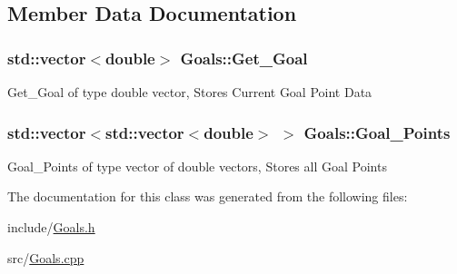 \subsection{Member Data Documentation}
\subsubsection[{\texorpdfstring{Get\+\_\+\+Goal}{Get_Goal}}]{\setlength{\rightskip}{0pt plus 5cm}std\+::vector$<$double$>$ Goals\+::\+Get\+\_\+\+Goal}\hypertarget{classGoals_a55d63f2dacadc111b312e6f22f7a33ba}{}\label{classGoals_a55d63f2dacadc111b312e6f22f7a33ba}
Get\+\_\+\+Goal of type double vector, Stores Current Goal Point Data 
\subsubsection[{\texorpdfstring{Goal\+\_\+\+Points}{Goal_Points}}]{\setlength{\rightskip}{0pt plus 5cm}std\+::vector$<$std\+::vector$<$double$>$ $>$ Goals\+::\+Goal\+\_\+\+Points\hspace{0.3cm}{\ttfamily [protected]}}\hypertarget{classGoals_ad6033ccf299d860e3d5bb826ea5a8bb6}{}\label{classGoals_ad6033ccf299d860e3d5bb826ea5a8bb6}
Goal\+\_\+\+Points of type vector of double vectors, Stores all Goal Points 

The documentation for this class was generated from the following files\+:\begin{DoxyCompactItemize}
\item 
include/\hyperlink{Goals_8h}{Goals.\+h}\item 
src/\hyperlink{Goals_8cpp}{Goals.\+cpp}\end{DoxyCompactItemize}
